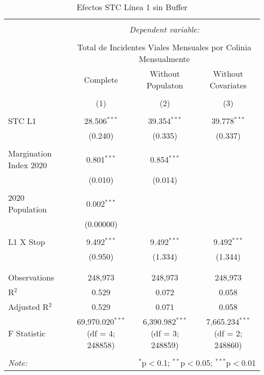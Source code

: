 
\begin{table}[!htbp] \centering 
  \caption{Efectos STC Línea 1 sin Buffer} 
  \label{} 
\begin{tabular}{@{\extracolsep{5pt}}lccc} 
\\[-1.8ex]\hline 
\hline \\[-1.8ex] 
 & \multicolumn{3}{c}{\textit{Dependent variable:}} \\ 
\cline{2-4} 
\\[-1.8ex] & \multicolumn{3}{c}{Total de Incidentes Viales Mensuales por Colinia Mensualmente} \\ 
 & Complete & Without Populaton & Without Covariates \\ 
\\[-1.8ex] & (1) & (2) & (3)\\ 
\hline \\[-1.8ex] 
 STC L1 & 28.506$^{***}$ & 39.354$^{***}$ & 39.778$^{***}$ \\ 
  & (0.240) & (0.335) & (0.337) \\ 
  & & & \\ 
 Margination Index 2020 & 0.801$^{***}$ & 0.854$^{***}$ &  \\ 
  & (0.010) & (0.014) &  \\ 
  & & & \\ 
 2020 Population & 0.002$^{***}$ &  &  \\ 
  & (0.00000) &  &  \\ 
  & & & \\ 
 L1 X Stop & 9.492$^{***}$ & 9.492$^{***}$ & 9.492$^{***}$ \\ 
  & (0.950) & (1.334) & (1.344) \\ 
  & & & \\ 
\hline \\[-1.8ex] 
Observations & 248,973 & 248,973 & 248,973 \\ 
R$^{2}$ & 0.529 & 0.072 & 0.058 \\ 
Adjusted R$^{2}$ & 0.529 & 0.071 & 0.058 \\ 
F Statistic & 69,970.020$^{***}$ (df = 4; 248858) & 6,390.982$^{***}$ (df = 3; 248859) & 7,665.234$^{***}$ (df = 2; 248860) \\ 
\hline 
\hline \\[-1.8ex] 
\textit{Note:}  & \multicolumn{3}{r}{$^{*}$p$<$0.1; $^{**}$p$<$0.05; $^{***}$p$<$0.01} \\ 
\end{tabular} 
\end{table} 
